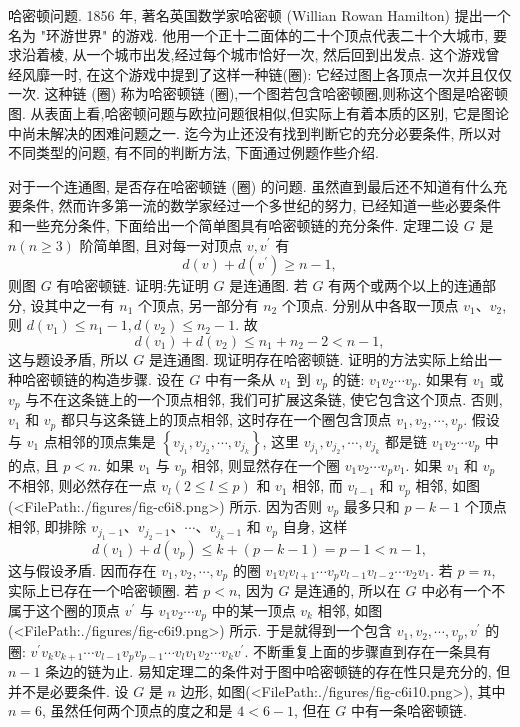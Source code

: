 
哈密顿问题.
1856 年, 著名英国数学家哈密顿 (Willian Rowan Hamilton) 提出一个名为 "环游世界" 的游戏.
他用一个正十二面体的二十个顶点代表二十个大城市, 要求沿着棱, 从一个城市出发,经过每个城市恰好一次, 然后回到出发点.
这个游戏曾经风靡一时, 在这个游戏中提到了这样一种链(圈): 它经过图上各顶点一次并且仅仅一次.
这种链 (圈) 称为哈密顿链 (圈),一个图若包含哈密顿圈,则称这个图是哈密顿图.
从表面上看,哈密顿问题与欧拉问题很相似,但实际上有着本质的区别, 它是图论中尚未解决的困难问题之一.
迄今为止还没有找到判断它的充分必要条件, 所以对不同类型的问题, 有不同的判断方法, 下面通过例题作些介绍.



对于一个连通图, 是否存在哈密顿链 (圈) 的问题.
虽然直到最后还不知道有什么充要条件, 然而许多第一流的数学家经过一个多世纪的努力, 已经知道一些必要条件和一些充分条件, 下面给出一个简单图具有哈密顿链的充分条件.
定理二设 $G$ 是 $n(n \geqslant 3)$ 阶简单图, 且对每一对顶点 $v, v^{\prime}$ 有
$$
d(v)+d\left(v^{\prime}\right) \geqslant n-1,
$$
则图 $G$ 有哈密顿链.
证明:先证明 $G$ 是连通图.
若 $G$ 有两个或两个以上的连通部分, 设其中之一有 $n_1$ 个顶点, 另一部分有 $n_2$ 个顶点.
分别从中各取一顶点 $v_1 、 v_2$, 则 $d\left(v_1\right) \leqslant n_1-1, d\left(v_2\right) \leqslant n_2-1$. 故
$$
d\left(v_1\right)+d\left(v_2\right) \leqslant n_1+n_2-2<n-1,
$$
这与题设矛盾, 所以 $G$ 是连通图.
现证明存在哈密顿链.
证明的方法实际上给出一种哈密顿链的构造步骤.
设在 $G$ 中有一条从 $v_1$ 到 $v_p$ 的链: $v_1 v_2 \cdots v_p$. 如果有 $v_1$ 或 $v_p$ 与不在这条链上的一个顶点相邻, 我们可扩展这条链, 使它包含这个顶点.
否则, $v_1$ 和 $v_p$ 都只与这条链上的顶点相邻, 这时存在一个圈包含顶点 $v_1, v_2, \cdots, v_p$. 假设与 $v_1$ 点相邻的顶点集是 $\left\{v_{j_1}, v_{j_2}, \cdots, v_{j_k}\right\}$, 这里 $v_{j_1}, v_{j_2}, \cdots, v_{j_k}$ 都是链 $v_1 v_2 \cdots v_p$ 中的点, 且 $p<n$.
如果 $v_1$ 与 $v_p$ 相邻, 则显然存在一个圈 $v_1 v_2 \cdots v_p v_1$.
如果 $v_1$ 和 $v_p$ 不相邻, 则必然存在一点 $v_l(2 \leqslant l \leqslant p)$ 和 $v_1$ 相邻, 而 $v_{l-1}$ 和 $v_p$ 相邻, 如图(<FilePath:./figures/fig-c6i8.png>) 所示.
因为否则 $v_p$ 最多只和 $p-k-1$ 个顶点相邻, 即排除 $v_{j_1-1} 、 v_{j_2-1} 、 \cdots 、 v_{j_k-1}$ 和 $v_p$ 自身, 这样
$$
d\left(v_1\right)+d\left(v_p\right) \leqslant k+(p-k-1)=p-1<n-1,
$$
这与假设矛盾.
因而存在 $v_1, v_2, \cdots, v_p$ 的圈 $v_1 v_l v_{l+1} \cdots v_p v_{l-1} v_{l-2} \cdots v_2 v_1$.
若 $p=n$, 实际上已存在一个哈密顿圈.
若 $p<n$, 因为 $G$ 是连通的, 所以在 $G$ 中必有一个不属于这个圈的顶点 $v^{\prime}$ 与 $v_1 v_2 \cdots v_p$ 中的某一顶点 $v_k$ 相邻, 如图(<FilePath:./figures/fig-c6i9.png>) 所示.
于是就得到一个包含 $v_1, v_2, \cdots, v_p, v^{\prime}$ 的圈: $v^{\prime} v_k v_{k+1} \cdots v_{l-1} v_p v_{p-1} \cdots v_l v_1 v_2 \cdots v_k v^{\prime}$. 不断重复上面的步骤直到存在一条具有 $n-1$ 条边的链为止.
易知定理二的条件对于图中哈密顿链的存在性只是充分的, 但并不是必要条件.
设 $G$ 是 $n$ 边形, 如图(<FilePath:./figures/fig-c6i10.png>), 其中 $n=6$, 虽然任何两个顶点的度之和是 $4<6-1$, 但在 $G$ 中有一条哈密顿链.



